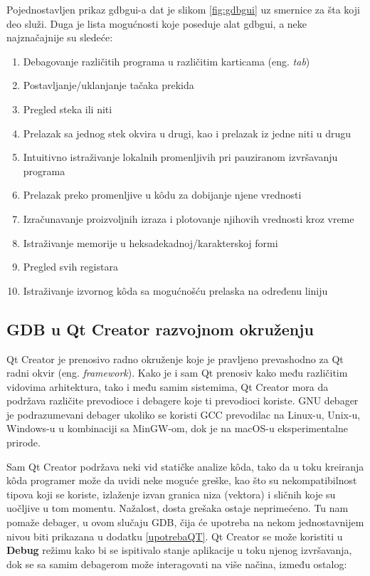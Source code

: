 \documentclass[a4paper]{article}
\begin{document}
Pojednostavljen prikaz gdbgui-a dat je slikom \ref{fig:gdbgui} uz smernice za šta koji deo služi.
Duga je lista mogućnosti koje poseduje alat gdbgui, a neke najznačajnije su sledeće\cite{n0where}: 
\begin{enumerate}
\item Debagovanje različitih programa u različitim karticama (eng. \textit{tab})
\item Postavljanje/uklanjanje tačaka prekida
\item Pregled steka ili niti
\item Prelazak sa jednog stek okvira u drugi, kao i prelazak iz jedne niti u drugu
\item Intuitivno istraživanje lokalnih promenljivih pri pauziranom izvršavanju programa
\item Prelazak preko promenljive u k\^{o}du za dobijanje njene vrednosti
\item Izračunavanje proizvoljnih izraza i plotovanje njihovih vrednosti kroz vreme
\item Istraživanje memorije u heksadekadnoj/karakterskoj formi
\item Pregled svih registara
\item Istraživanje izvornog k\^{o}da sa mogućnošću prelaska na određenu liniju
\end{enumerate}



\subsection{GDB u Qt Creator razvojnom okruženju}
\label{subsec:QT}

Qt Creator je prenosivo radno okruženje koje je pravljeno prevashodno za Qt radni okvir (eng. \textit{framework}).
Kako je i sam Qt prenosiv kako među različitim vidovima arhitektura, tako i među samim sistemima, Qt Creator
mora da podržava različite prevodioce i debagere koje ti prevodioci koriste. GNU debager je podrazumevani debager
ukoliko se koristi GCC prevodilac na Linux-u, Unix-u, Windows-u u kombinaciji sa MinGW-om, dok je na macOS-u
eksperimentalne prirode\cite{QT}. 

Sam Qt Creator podržava neki vid statičke analize k\^{o}da, tako da u toku kreiranja k\^{o}da programer može da 
uvidi neke moguće greške, kao što su nekompatibilnost tipova koji se koriste, izlaženje izvan granica niza (vektora) 
i sličnih koje su uočljive u tom momentu. Nažalost, dosta grešaka ostaje neprimećeno. Tu nam pomaže debager,
u ovom slučaju GDB, čija će upotreba na nekom jednostavnijem nivou biti prikazana u dodatku \ref{upotrebaQT}. 
Qt Creator se može koristiti u \textbf{Debug} režimu kako bi se ispitivalo stanje aplikacije u toku njenog izvršavanja,
dok se sa samim debagerom može interagovati na više načina, između ostalog\cite{QT}:
\end{document}
